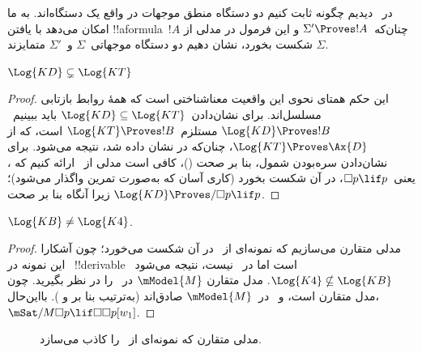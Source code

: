 \documentclass[../../../include/open-logic-section]{subfiles}
\begin{document}


در~ دیدیم چگونه ثابت کنیم دو دستگاه منطق موجهات در واقع
یک دستگاه‌اند.  به ما امکان می‌دهد با یافتن
!!a{formula}~$!A$ چنان‌که~$\Sigma' \Proves !A$ و این فرمول در مدلی از
$\Sigma$ شکست بخورد، نشان دهیم دو دستگاه موجهاتی~$\Sigma$ و~$\Sigma'$
متمایزند.

\begin{prop}
  $\Log{KD} \subsetneq \Log{KT}$
\end{prop}

\begin{proof} این حکم همتای نحوی این واقعیت معناشناختی است که همهٔ روابط
  بازتابی مسلسل‌اند. برای نشان‌دادن~$\Log{KD} \subseteq \Log{KT}$ باید
  ببینیم~$\Log{KD} \Proves !B$ مستلزم~$\Log{KT} \Proves !B$ است، که از
  $\Log{KT} \Proves \Ax{D}$، چنان‌که در
   نشان داده شد،
  نتیجه می‌شود. برای نشان‌دادن سره‌بودن شمول، بنا بر صحت
  ()، کافی است مدلی از~ ارائه کنیم که
  ، یعنی~$\Box p \lif p$، در آن شکست بخورد (کاری آسان که به‌صورت
  تمرین واگذار می‌شود)؛ زیرا آنگاه بنا بر صحت
  $\Log{KD} \Proves/ \Box p \lif p$.
\end{proof}

\begin{prop}
  $\Log{KB} \neq \Log{K4}$. 
\end{prop}

\begin{proof}
  مدلی متقارن می‌سازیم که نمونه‌ای از~ در آن شکست می‌خورد؛ چون
  آشکارا این نمونه در~ !!{derivable} است اما در~ نیست،
  نتیجه می‌شود~$\Log{K4} \nsubseteq \Log{KB}$. مدل متقارن
  $\mModel{M}$ در~ را در نظر بگیرید. چون مدل متقارن
  است،  و~ در~$\mModel{M}$ صادق‌اند (به‌ترتیب بنا بر
   و
  ). بااین‌حال،
  $\mSat/{M}{\Box p \lif \Box\Box p}[w_1]$.
\end{proof}

\begin{figure}[htpb]
  \centering
  \caption{مدلی متقارن که نمونه‌ای از~ را کاذب می‌سازد.}
\end{figure}
 
\end{document}
